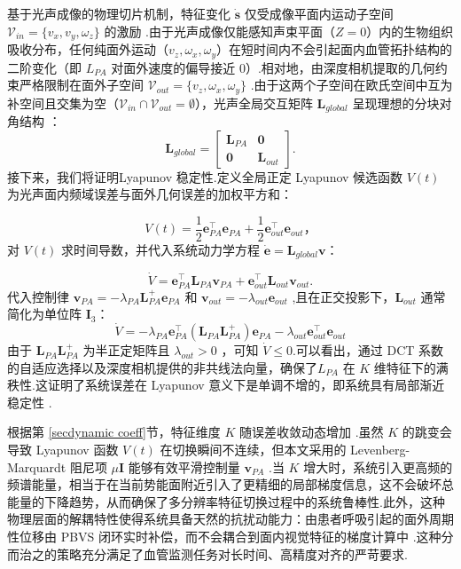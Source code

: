 \documentclass{article}
\begin{document}
基于光声成像的物理切片机制，特征变化 $\dot{\mathbf{s}}$ 仅受成像平面内运动子空间 $\mathcal{V}_{in} = \{v_x, v_y, \omega_z\}$ 的激励 .由于光声成像仅能感知声束平面（$Z=0$）内的生物组织吸收分布，任何纯面外运动（$v_z, \omega_x, \omega_y$）在短时间内不会引起面内血管拓扑结构的二阶变化（即 $L_{PA}$ 对面外速度的偏导接近 0）.相对地，由深度相机提取的几何约束严格限制在面外子空间 $\mathcal{V}_{out} = \{v_z, \omega_x, \omega_y\}$ .由于这两个子空间在欧氏空间中互为补空间且交集为空（$\mathcal{V}_{in} \cap \mathcal{V}_{out} = \emptyset$），光声全局交互矩阵 $\mathbf{L}_{global}$ 呈现理想的分块对角结构 ：
\begin{equation}
    \mathbf{L}_{global} = \begin{bmatrix} \mathbf{L}_{PA} & \mathbf{0} \\ \mathbf{0} & \mathbf{L}_{out} \end{bmatrix}.
\end{equation}
接下来，我们将证明Lyapunov 稳定性.定义全局正定 Lyapunov 候选函数 $V(t)$ 为光声面内频域误差与面外几何误差的加权平方和：

\begin{equation}
    V(t) = \frac{1}{2} \mathbf{e}_{PA}^\top \mathbf{e}_{PA} + \frac{1}{2} \mathbf{e}_{out}^\top \mathbf{e}_{out}，
\end{equation}
对 $V(t)$ 求时间导数，并代入系统动力学方程 $\dot{\mathbf{e}} = \mathbf{L}_{global} \mathbf{v}$：

\begin{equation}
    \dot{V} = \mathbf{e}_{PA}^\top \mathbf{L}_{PA} \mathbf{v}_{PA} + \mathbf{e}_{out}^\top \mathbf{L}_{out} \mathbf{v}_{out}.
\end{equation}
代入控制律 $\mathbf{v}_{PA} = -\lambda_{PA} \mathbf{L}_{PA}^+ \mathbf{e}_{PA}$ 和 $\mathbf{v}_{out} = -\lambda_{out} \mathbf{e}_{out}$ ,且在正交投影下，$\mathbf{L}_{out}$ 通常简化为单位阵 $\mathbf{I}_3$：
\begin{equation}
    \dot{V} = -\lambda_{PA} \mathbf{e}_{PA}^\top (\mathbf{L}_{PA} \mathbf{L}_{PA}^+) \mathbf{e}_{PA} - \lambda_{out} \mathbf{e}_{out}^\top \mathbf{e}_{out}
\end{equation}
由于 $\mathbf{L}_{PA} \mathbf{L}_{PA}^+$ 为半正定矩阵且 $\lambda_{out} > 0$ ，可知 $\dot{V} \le 0$.可以看出，通过 DCT 系数的自适应选择以及深度相机提供的非共线法向量，确保了$L_{PA}$ 在 $K$ 维特征下的满秩性.这证明了系统误差在 Lyapunov 意义下是单调不增的，即系统具有局部渐近稳定性 .

根据第 \cref{secdynamic coeff}节，特征维度 $K$ 随误差收敛动态增加 .虽然 $K$ 的跳变会导致 Lyapunov 函数 $V(t)$ 在切换瞬间不连续，但本文采用的 Levenberg-Marquardt 阻尼项 $\mu \mathbf{I}$ 能够有效平滑控制量 $\mathbf{v}_{PA}$ .当 $K$ 增大时，系统引入更高频的频谱能量，相当于在当前势能面附近引入了更精细的局部梯度信息，这不会破坏总能量的下降趋势，从而确保了多分辨率特征切换过程中的系统鲁棒性.此外，这种物理层面的解耦特性使得系统具备天然的抗扰动能力：由患者呼吸引起的面外周期性位移由 PBVS 闭环实时补偿，而不会耦合到面内视觉特征的梯度计算中 .这种分而治之的策略充分满足了血管监测任务对长时间、高精度对齐的严苛要求.



\end{document}
